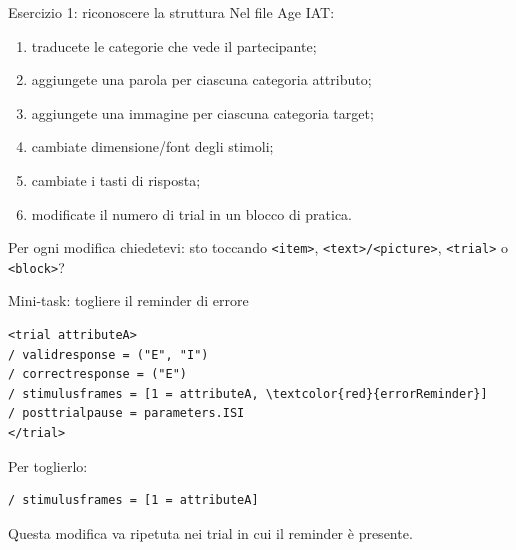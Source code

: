 \documentclass[compress]{beamer}
\begin{document}
\begin{frame}{Esercizio 1: riconoscere la struttura}
Nel file Age IAT:

\vspace{2mm}
\begin{enumerate}
  \item traducete le categorie che vede il partecipante;
  \item aggiungete una parola per ciascuna categoria attributo;
  \item aggiungete una immagine per ciascuna categoria target;
  \item cambiate dimensione/font degli stimoli;
  \item cambiate i tasti di risposta;
  \item modificate il numero di trial in un blocco di pratica.
\end{enumerate}

\vspace{3mm}
Per ogni modifica chiedetevi: sto toccando \texttt{<item>}, \texttt{<text>/<picture>}, \texttt{<trial>} o \texttt{<block>}?
\end{frame}

\begin{frame}[fragile]{Mini-task: togliere il reminder di errore}
\begin{small}
\begin{Verbatim}[commandchars=\\\{\}]
<trial attributeA>
/ validresponse = ("E", "I")
/ correctresponse = ("E")
/ stimulusframes = [1 = attributeA, \textcolor{red}{errorReminder}]
/ posttrialpause = parameters.ISI
</trial>
\end{Verbatim}
\end{small}

\vspace{2mm}
Per toglierlo:
\begin{small}
\begin{Verbatim}
/ stimulusframes = [1 = attributeA]
\end{Verbatim}
\end{small}

\vspace{2mm}
Questa modifica va ripetuta nei trial in cui il reminder è presente.
\end{frame}
\end{document}
